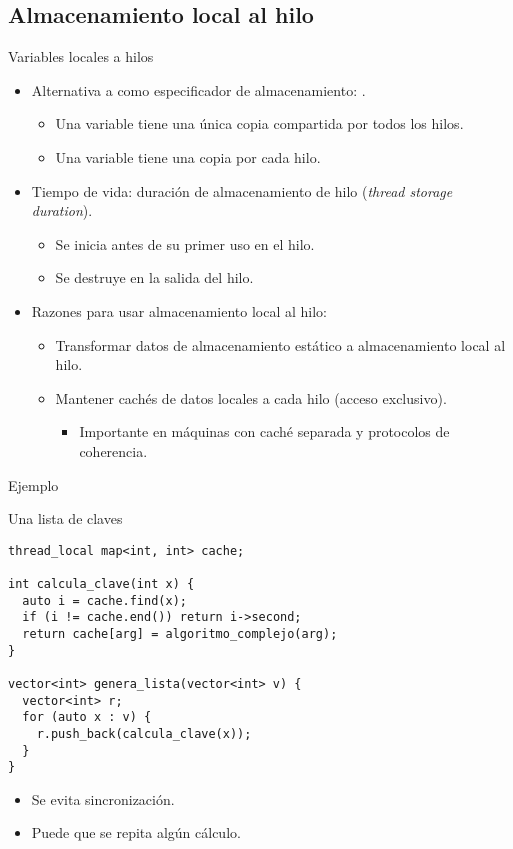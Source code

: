 \subsection{Almacenamiento local al hilo}

\begin{frame}{Variables locales a hilos}
\begin{itemize}
  \item Alternativa a  como especificador de almacenamiento: .
    \begin{itemize}
      \item Una variable  tiene una única copia compartida por todos los hilos.
      \item Una variable  tiene una copia por cada hilo.
    \end{itemize}
  \pause
  \item Tiempo de vida: duración de almacenamiento de hilo (\emph{thread storage duration}).
    \begin{itemize}
      \item Se inicia antes de su primer uso en el hilo.
      \item Se destruye en la salida del hilo.
    \end{itemize}
  \pause
  \item Razones para usar almacenamiento local al hilo:
    \begin{itemize}
      \item Transformar datos de almacenamiento estático a almacenamiento local al hilo.
      \item Mantener cachés de datos locales a cada hilo (acceso exclusivo).
        \begin{itemize}
          \item Importante en máquinas con caché separada y protocolos de coherencia.
        \end{itemize}
    \end{itemize}
\end{itemize}
\end{frame}

\begin{frame}[fragile]{Ejemplo}
\begin{block}{Una lista de claves}
\begin{lstlisting}
thread_local map<int, int> cache;

int calcula_clave(int x) {
  auto i = cache.find(x);
  if (i != cache.end()) return i->second;
  return cache[arg] = algoritmo_complejo(arg);
}

vector<int> genera_lista(vector<int> v) {
  vector<int> r;
  for (auto x : v) {
    r.push_back(calcula_clave(x));
  }
}
\end{lstlisting}
\end{block}
\begin{itemize}
  \item Se evita sincronización.
  \item Puede que se repita algún cálculo.
\end{itemize}
\end{frame}

